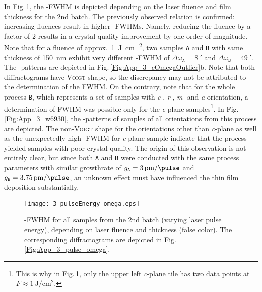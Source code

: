 In Fig.\,\ref{Fig:Results_3_pulseOmega}, the \textomega-FWHM is depicted depending on the laser fluence and film thickness for the 2nd batch.
The previously observed relation is confirmed: increasing fluences result in higher \textomega-FWHMs.
Namely, reducing the fluence by a factor of 2 results in a crystal quality improvement by one order of magnitude.
Note that for a fluence of approx.\ \qty{1}{\J\per\cm\squared}, two samples \texttt{A} and \texttt{B} with same thickness of \qty{150}{\nm} exhibit very different \textomega-FWHM of $\Delta\omega_\mathtt{A}=\qty{8}{\arcminute}$ and $\Delta\omega_\mathtt{B}=\qty{49}{\arcminute}$.
The \textomega-patterns are depicted in Fig.\,\ref{Fig:App_3_cOmegaOutlier}b.
Note that both diffractograms have \textsc{Voigt} shape, so the discrepancy may not be attributed to the determination of the \gls{FWHM}.
On the contrary, note that for the whole process \texttt{B}, which represents a set of samples with \textit{c}-, \textit{r}-, \textit{m}- and \textit{a}-orientation, a determination of FWHM was possible only for the \textit{c}-plane samples\footnote{
    This is why in Fig.\,\ref{Fig:Results_3_pulseOmega}, only the upper left \textit{c}-plane tile has two data points at $F\approx\qty{1}{\J\per\cm\squared}$.
}.
In Fig.\,\ref{Fig:App_3_w6930}, the \textomega-patterns of samples of all orientations from this process are depicted.
The non-\textsc{Voigt} shape for the orientations other than \textit{c}-plane as well as the unexpectedly high \textomega-FWHM for \textit{c}-plane sample indicate that the process yielded samples with poor crystal quality.
The origin of this observation is not entirely clear, but since both \texttt{A} and \texttt{B} were conducted with the same process parameters with similar growthrate of $g_\mathtt{A}=\qty{3}{\pm\per\pulse}$ and $g_\mathtt{B}=\qty{3.75}{\pm\per\pulse}$, an unknown effect must have influenced the thin film deposition substantially.

\begin{figure}
    \centering
    \texttt{[image: 3\_pulseEnergy\_omega.eps]}
    \caption{
        \textomega-FWHM for all samples from the 2nd batch (varying laser pulse energy), depending on laser fluence and thickness (false color).
        The corresponding diffractograms are depicted in Fig.\,\ref{Fig:App_3_pulse_omega}. 
    }
    \label{Fig:Results_3_pulseOmega}
\end{figure}